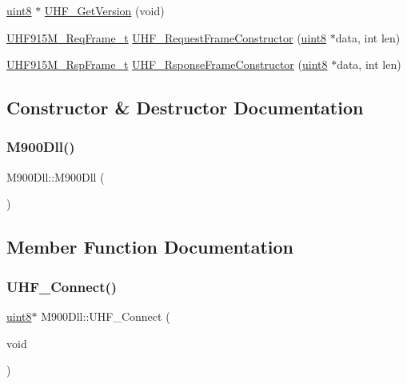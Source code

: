 \begin{DoxyCompactItemize}
\item 
\mbox{\hyperlink{m900dll_8h_adde6aaee8457bee49c2a92621fe22b79}{uint8}} $\ast$ \mbox{\hyperlink{class_m900_dll_adf85ef53e761928a63bbe7e86bfcdc49}{U\+H\+F\+\_\+\+Get\+Version}} (void)
\item 
\mbox{\hyperlink{struct_u_h_f915_m___req_frame__t}{U\+H\+F915\+M\+\_\+\+Req\+Frame\+\_\+t}} \mbox{\hyperlink{class_m900_dll_a0864fb5c8151d482d10996d6d1e7f3c9}{U\+H\+F\+\_\+\+Request\+Frame\+Constructor}} (\mbox{\hyperlink{m900dll_8h_adde6aaee8457bee49c2a92621fe22b79}{uint8}} $\ast$data, int len)
\item 
\mbox{\hyperlink{struct_u_h_f915_m___rsp_frame__t}{U\+H\+F915\+M\+\_\+\+Rsp\+Frame\+\_\+t}} \mbox{\hyperlink{class_m900_dll_a9b712270dfedfb455b2e36abddcc92a2}{U\+H\+F\+\_\+\+Rsponse\+Frame\+Constructor}} (\mbox{\hyperlink{m900dll_8h_adde6aaee8457bee49c2a92621fe22b79}{uint8}} $\ast$data, int len)
\end{DoxyCompactItemize}


\subsection{Constructor \& Destructor Documentation}
\mbox{\label{class_m900_dll_aa2e1ef624394965f93614ca2c6913383}} 
\subsubsection{\texorpdfstring{M900Dll()}{M900Dll()}}
{\footnotesize\ttfamily M900\+Dll\+::\+M900\+Dll (\begin{DoxyParamCaption}{ }\end{DoxyParamCaption})}



\subsection{Member Function Documentation}
\mbox{\label{class_m900_dll_a1dc3932fe303c73e955cb116b404e197}} 
\subsubsection{\texorpdfstring{UHF\_Connect()}{UHF\_Connect()}}
{\footnotesize\ttfamily \mbox{\hyperlink{m900dll_8h_adde6aaee8457bee49c2a92621fe22b79}{uint8}}$\ast$ M900\+Dll\+::\+U\+H\+F\+\_\+\+Connect (\begin{DoxyParamCaption}\item[{void}]{ }\end{DoxyParamCaption})}

